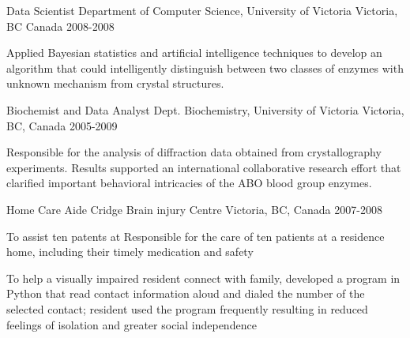 


\begin{cventries}

\cventry
{Data Scientist} %
{Department of Computer Science, University of Victoria} %
{Victoria, BC Canada} %
{2008-2008} %
{ %
\begin{cvitems}
\item {Applied Bayesian statistics and artificial intelligence techniques to develop an algorithm that could intelligently distinguish between two classes of enzymes with unknown mechanism from crystal structures.}
\end{cvitems}
}


\cventry
{Biochemist and Data Analyst} %
{Dept. Biochemistry, University of Victoria} %
{Victoria, BC, Canada} %
{2005-2009} %
{ %
\begin{cvitems}
\item {Responsible for the analysis of diffraction data obtained from crystallography experiments. Results supported an international collaborative research effort that clarified important behavioral intricacies of the ABO blood group enzymes. }
\end{cvitems}
}


\cventry
{Home Care Aide} %
{Cridge Brain injury Centre} %
{Victoria, BC, Canada} %
{2007-2008} %
{ %
\begin{cvitems}
\item {To assist ten patents at Responsible for the care of ten patients at a residence home, including their timely medication and safety}
\item {To help a visually impaired resident connect with family, developed a program in Python that read contact information aloud and dialed the number of the selected contact; resident used the program frequently resulting in reduced feelings of isolation and greater social independence}
\end{cvitems} 
}


\end{cventries}
